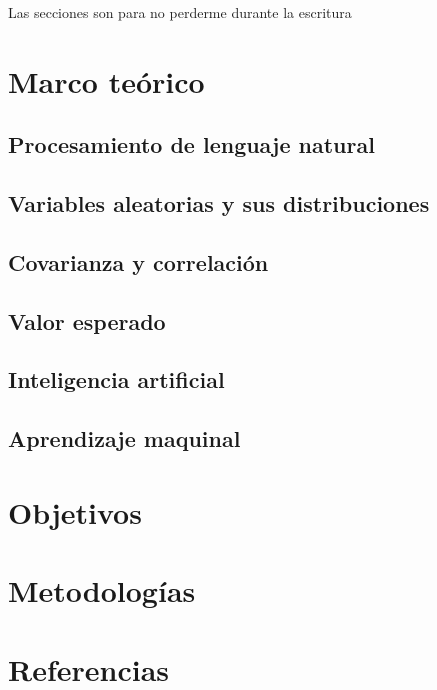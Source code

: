 \documentclass[12pt,letterpaper]{article}
\begin{document}
\maketitle
%
\tableofcontents
\pagebreak
Las secciones son para no perderme durante la escritura
\section {Marco teórico}\label{sec:marco}



\subsection {Procesamiento de lenguaje natural}\label{subsec:nlp}
\subsection {Variables aleatorias y sus distribuciones}\label{subsec:vayd}
\subsection {Covarianza y correlación}\label{subsec:reg1}
\subsection {Valor esperado}\label{subsec:valesp}
\subsection {Inteligencia artificial}\label{subsec:intela}
\subsection {Aprendizaje maquinal}\label{subsec:machinel}
\section {Objetivos}\label{sec:objetivos}
\section {Metodologías}\label{sec:metod}
\section {Referencias}\label{sec:refs}
\printbibliography[heading=none]
\end{document}
